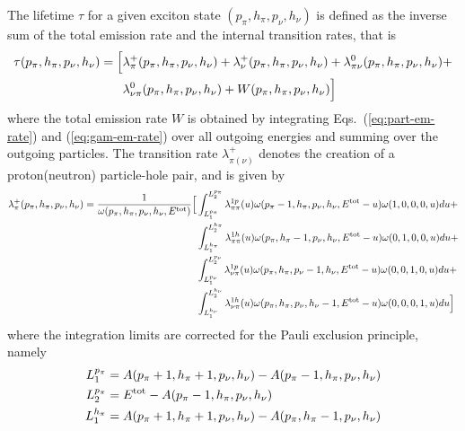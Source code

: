 \documentclass[
10pt,
showpacs,preprintnumbers,footinbib,
amsfonts,amsmath,amssymb,
aps,
prc,twocolumn,groupedaddress,superscriptaddress,
showkeys,
nofootinbib
]{revtex4-1}
\begin{document}
\begin{widetext}
The lifetime $\tau$ for a given exciton state $(p_\pi, h_\pi, p_\nu, h_\nu)$ is defined as the inverse sum of the total emission rate and the internal transition rates, that is
\begin{align}
\tau(p_\pi, h_\pi, p_\nu, h_\nu) = \Big [ & \lambda_\pi^+(p_\pi, h_\pi, p_\nu, h_\nu)  + 
                                                                \lambda_\nu^+(p_\pi, h_\pi, p_\nu, h_\nu) + 
                                                                \lambda_{\pi\nu}^0(p_\pi, h_\pi, p_\nu, h_\nu) + \notag\\
                                                             & \lambda_{\nu\pi}^0(p_\pi, h_\pi, p_\nu, h_\nu) + W(p_\pi, h_\pi, p_\nu, h_\nu) \Big ]
\end{align}
where the total emission rate $W$ is obtained by integrating Eqs.~(\ref{eq:part-em-rate}) and  (\ref{eq:gam-em-rate}) over all outgoing energies and summing over the outgoing particles. The transition rate $\lambda_{\pi(\nu)}^+$ denotes the creation of a proton(neutron) particle-hole pair, and is given
by
\begin{align}
\lambda_\pi^+(p_\pi, h_\pi, p_\nu, h_\nu) = \frac{1}{\omega(p_\pi, h_\pi, p_\nu, h_\nu,E^{\rm tot})} 
         \Big [ & \int_{L_1^{p_\pi}}^{L_2^{p_\pi}}\lambda_{\pi\pi}^{1p}(u)\omega(p_\pi-1, h_\pi, p_\nu, h_\nu,E^{\rm tot}-u)\omega(1,0,0,0,u)du + \notag\\
                  & \int_{L_1^{h_\pi}}^{L_2^{h_\pi}}\lambda_{\pi\pi}^{1h}(u)\omega(p_\pi, h_\pi-1, p_\nu, h_\nu,E^{\rm tot}-u)\omega(0,1,0,0,u)du + \notag\\
                  & \int_{L_1^{p_\nu}}^{L_2^{p_\nu}}\lambda_{\nu\pi}^{1p}(u)\omega(p_\pi, h_\pi, p_\nu-1, h_\nu,E^{\rm tot}-u)\omega(0,0,1,0,u)du + \notag\\
                  & \int_{L_1^{h_\nu}}^{L_2^{h_\nu}}\lambda_{\nu\pi}^{1h}(u)\omega(p_\pi, h_\pi, p_\nu, h_\nu-1,E^{\rm tot}-u)\omega(0,0,0,1,u)du 
         \Big ]
\label{eq:lamplus}
\end{align}
where the integration limits are corrected for the Pauli exclusion principle, namely
\begin{align}
L_1^{p_\pi} & = A(p_\pi+1, h_\pi+1, p_\nu, h_\nu) - A(p_\pi-1, h_\pi, p_\nu, h_\nu) \notag \\
L_2^{p_\pi} & = E^{\rm tot}  - A(p_\pi-1, h_\pi, p_\nu, h_\nu) \notag\\
L_1^{h_\pi} & = A(p_\pi+1, h_\pi+1, p_\nu, h_\nu) - A(p_\pi, h_\pi-1, p_\nu, h_\nu) \notag \\

\end{align}
\end{widetext}
\end{document}

